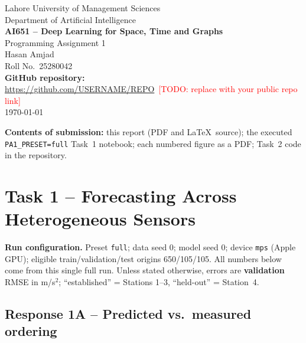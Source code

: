 \documentclass[11pt,a4paper]{article}
\newcommand{\todo}[1]{\textcolor{red}{[TODO: #1]}}
\begin{document}
\begin{titlepage}
\centering
{\large Lahore University of Management Sciences}\\[2pt]
{\large Department of Artificial Intelligence}\\[24pt]
{\LARGE \textbf{AI651 -- Deep Learning for Space, Time and Graphs}}\\[8pt]
{\Large Programming Assignment 1}\\[30pt]
{\large Hasan Amjad}\\[2pt]
{\large Roll No.\ 25280042}\\[24pt]
\textbf{GitHub repository:}\\
\url{https://github.com/USERNAME/REPO}\ \todo{replace with your public repo link}\\[24pt]
\today
\vfill
\begin{flushleft}
\small
\textbf{Contents of submission:} this report (PDF and \LaTeX\ source); the executed
\texttt{PA1\_PRESET=full} Task~1 notebook; each numbered figure as a PDF; Task~2 code in the repository.
\end{flushleft}
\end{titlepage}

\section*{Task 1 -- Forecasting Across Heterogeneous Sensors}

\noindent\textbf{Run configuration.}
Preset \texttt{full}; data seed 0; model seed 0; device \texttt{mps} (Apple GPU);
eligible train/validation/test origins 650/105/105.
All numbers below come from this single full run. Unless stated otherwise, errors are
\textbf{validation} RMSE in m/s$^2$; ``established'' = Stations 1--3, ``held-out'' = Station~4.

\subsection*{Response 1A -- Predicted vs.\ measured ordering}
\end{document}

